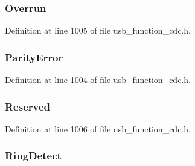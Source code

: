 \subsubsection[{Overrun}]{ Overrun}\label{union_b_m___s_e_r_i_a_l___s_t_a_t_e_ae5fdd6177f09e3742ed44adae8cb028d}


Definition at line 1005 of file usb\+\_\+function\+\_\+cdc.\+h.

\hypertarget{union_b_m___s_e_r_i_a_l___s_t_a_t_e_a40f7f53ea6fec0b134ac23234f790026}{}
\subsubsection[{Parity\+Error}]{ Parity\+Error}\label{union_b_m___s_e_r_i_a_l___s_t_a_t_e_a40f7f53ea6fec0b134ac23234f790026}


Definition at line 1004 of file usb\+\_\+function\+\_\+cdc.\+h.

\hypertarget{union_b_m___s_e_r_i_a_l___s_t_a_t_e_adba0129493ef67a85dd97e7e842ee410}{}
\subsubsection[{Reserved}]{ Reserved}\label{union_b_m___s_e_r_i_a_l___s_t_a_t_e_adba0129493ef67a85dd97e7e842ee410}


Definition at line 1006 of file usb\+\_\+function\+\_\+cdc.\+h.

\hypertarget{union_b_m___s_e_r_i_a_l___s_t_a_t_e_aa0f142c94693826b4b5c1b5e3e89a4f4}{}
\subsubsection[{Ring\+Detect}]{ Ring\+Detect}\label{union_b_m___s_e_r_i_a_l___s_t_a_t_e_aa0f142c94693826b4b5c1b5e3e89a4f4}


